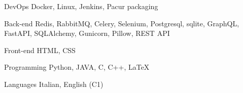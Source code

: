 

\begin{cvskills}

  \cvskill
    {DevOps} %
    {Docker, Linux, Jenkins, Pacur packaging} %

  \cvskill
    {Back-end} %
    {Redis, RabbitMQ, Celery, Selenium, Postgresql, sqlite, GraphQL, FastAPI, SQLAlchemy, Gunicorn, Pillow, REST API} %

  \cvskill
    {Front-end} %
    {HTML, CSS} %

  \cvskill
    {Programming} %
    {Python, JAVA, C, C++,  LaTeX} %

  \cvskill
    {Languages} %
    {Italian, English (C1)} %

\end{cvskills}
